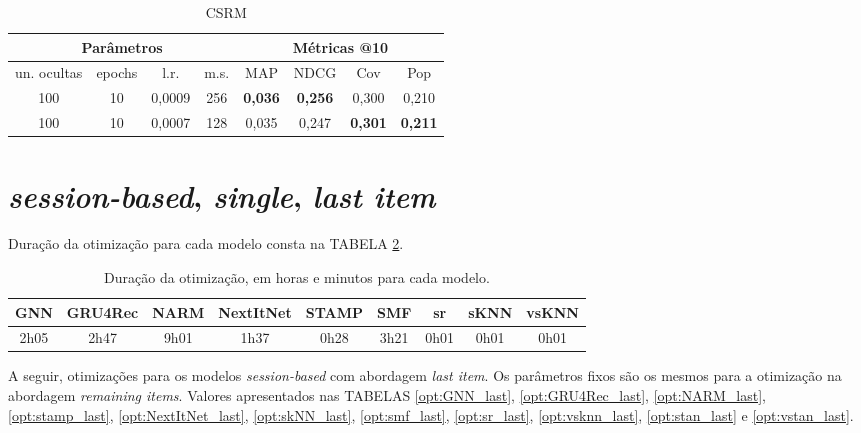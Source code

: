 \begin{table}[htbp]
  \centering
  \begin{tabular}{|c|c|c|c|c|c|c|c|}
    \hline
      \multicolumn{4}{|c|}{Parâmetros} & \multicolumn{4}{c|}{Métricas @10} \\
      \hline
      un. ocultas & epochs & l.r. & m.s. & MAP & NDCG & Cov & Pop \\
      \hline
      100 & 10 & 0,0009 & 256 & \textbf{0,036} & \textbf{0,256} & 0,300 & 0,210 \\
      \hline
      100 & 10 & 0,0007 & 128 & 0,035 & 0,247 & \textbf{0,301} & \textbf{0,211} \\
      \hline
     \end{tabular}
      \caption{CSRM}
      \label{opt:csrm_rem}
\end{table}


\newpage

\section{\textit{session-based}, \textit{single}, \textit{last item}}
Duração da otimização para cada modelo consta na TABELA \ref{tab:duration_opt_last}.


\begin{table}[htbp]
  \centering
  \begin{tabular}{|c|c|c|c|c|c|c|c|c|}
      \hline
      GNN & GRU4Rec & NARM & NextItNet & STAMP & SMF & sr & sKNN & vsKNN \\
      \hline
      2h05 & 2h47 & 9h01 & 1h37 & 0h28 &  3h21 & 0h01 & 0h01 & 0h01 \\
      \hline
      \end{tabular}
      \caption{Duração da otimização, em horas e minutos para cada modelo.}
      \label{tab:duration_opt_last}
\end{table}

A seguir, otimizações para os modelos \textit{session-based} com abordagem
\textit{last item}. Os parâmetros fixos são os mesmos para a otimização na
abordagem \textit{remaining items}. Valores apresentados nas TABELAS
\ref{opt:GNN_last}, \ref{opt:GRU4Rec_last}, \ref{opt:NARM_last},
\ref{opt:stamp_last}, \ref{opt:NextItNet_last}, \ref{opt:skNN_last},
\ref{opt:smf_last}, \ref{opt:sr_last}, \ref{opt:vsknn_last},
\ref{opt:stan_last} e \ref{opt:vstan_last}.

